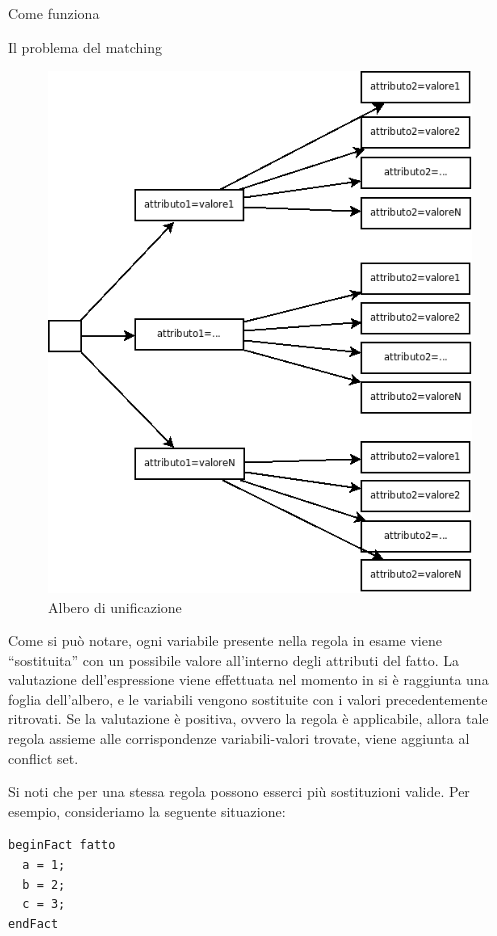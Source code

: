 \begin{chapter}{Come funziona}
\begin{section}{Il problema del matching}
\begin{figure}
	\centering
	\includegraphics[scale=.45]{img/alberounificazione.png}
	\caption{Albero di unificazione}
	\label{fig:alberounificazione}
\end{figure}

Come si pu\`o notare, ogni variabile presente nella regola in esame viene
``sostituita'' con un possibile valore all'interno degli attributi del
fatto. La valutazione dell'espressione viene effettuata nel momento in si
\`e raggiunta una foglia dell'albero, e le variabili vengono sostituite
con i valori precedentemente ritrovati. Se la valutazione \`e positiva,
ovvero la regola \`e applicabile, allora tale regola assieme alle
corrispondenze variabili-valori trovate, viene aggiunta al conflict set.

Si noti che per una stessa regola possono esserci pi\`u sostituzioni valide.
Per esempio, consideriamo la seguente situazione:

\begin{verbatim}
beginFact fatto
  a = 1;
  b = 2;
  c = 3;
endFact


\end{verbatim}
\end{section}
\end{chapter}
